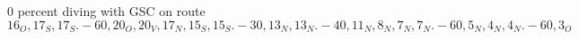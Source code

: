
\begin{figure}
\label{tik:0:16_O, 17_S, 17_S.-60, 20_O, 20_V, 17_N, 15_S, 15_S.-30, 13_N, 13_N.-40, 11_N, 8_N, 7_N, 7_N.-60, 5_N, 4_N, 4_N.-60, 3_O}
\caption{0 percent diving with GSC on route $16_O, 17_S, 17_S.-60, 20_O, 20_V, 17_N, 15_S, 15_S.-30, 13_N, 13_N.-40, 11_N, 8_N, 7_N, 7_N.-60, 5_N, 4_N, 4_N.-60, 3_O$}
\end{figure}
